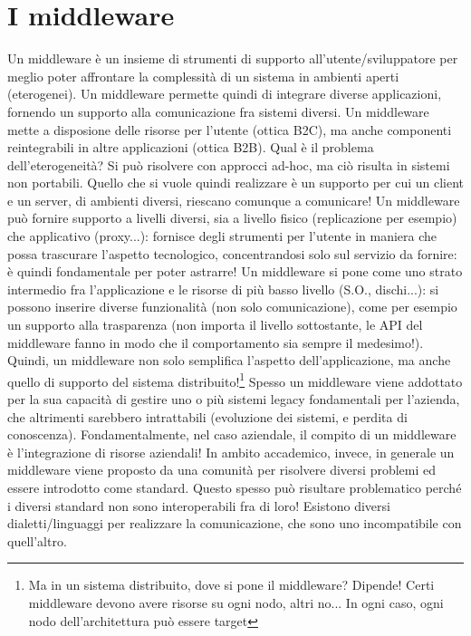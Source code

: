 \chapter{I middleware}
Un middleware è un insieme di strumenti di supporto all'utente/sviluppatore per meglio poter affrontare la complessità
di un sistema in ambienti aperti (eterogenei). Un middleware permette quindi di integrare diverse applicazioni,
fornendo un supporto alla comunicazione fra sistemi diversi.
Un middleware mette a disposione delle risorse per l'utente (ottica B2C), ma anche componenti reintegrabili in altre
applicazioni (ottica B2B).
Qual è il problema dell'eterogeneità? Si può risolvere con approcci ad-hoc, ma ciò risulta in sistemi non portabili.
Quello che si vuole quindi realizzare è un supporto per cui un client e un server, di ambienti diversi, riescano
comunque a comunicare!
Un middleware può fornire supporto a livelli diversi, sia a livello fisico (replicazione per esempio) che applicativo
(proxy...): fornisce degli strumenti per l'utente in maniera che possa trascurare l'aspetto tecnologico,
concentrandosi solo sul servizio da fornire: è quindi fondamentale per poter astrarre!
Un middleware si pone come uno strato intermedio fra l'applicazione e le risorse di più basso livello
(S.O., dischi...): si possono inserire diverse funzionalità (non solo comunicazione), come per esempio un supporto
alla trasparenza (non importa il livello sottostante, le API del middleware fanno in modo che il comportamento sia
sempre il medesimo!). Quindi, un middleware non solo semplifica l'aspetto dell'applicazione, ma anche quello di supporto
del sistema distribuito!\footnote{Ma in un sistema distribuito, dove si pone il middleware? Dipende! Certi middleware
devono avere risorse su ogni nodo, altri no... In ogni caso, ogni nodo dell'architettura può essere target}
Spesso un middleware viene addottato per la sua capacità di gestire uno o più sistemi legacy fondamentali per
l'azienda, che altrimenti sarebbero intrattabili (evoluzione dei sistemi, e perdita di conoscenza). Fondamentalmente,
nel caso aziendale, il compito di un middleware è l'integrazione di risorse aziendali!
In ambito accademico, invece, in generale un middleware viene proposto da una comunità per risolvere diversi problemi
ed essere introdotto come standard.
Questo spesso può risultare problematico perché i diversi standard non sono interoperabili fra di loro! Esistono
diversi dialetti/linguaggi per realizzare la comunicazione, che sono uno incompatibile con quell'altro.
